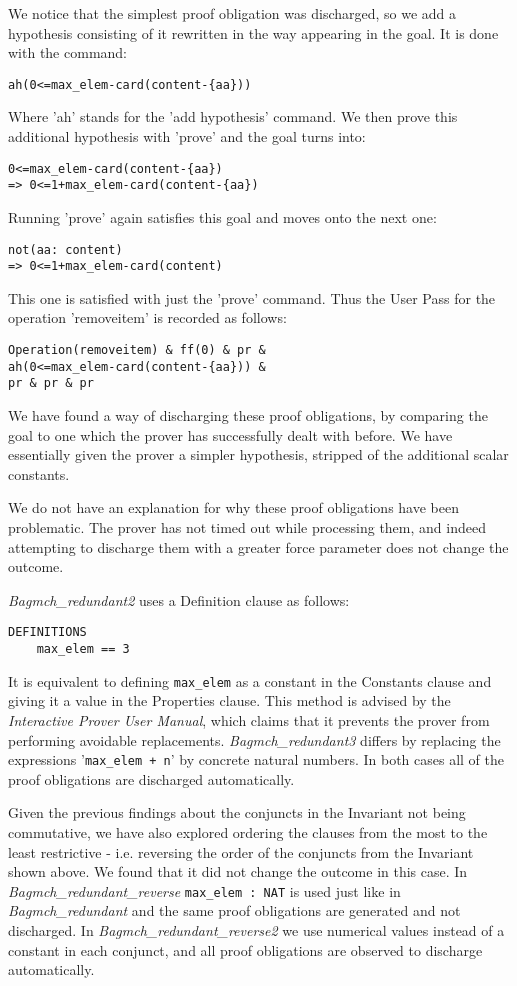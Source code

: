 \documentclass[11pt,journal]{IEEEtran}
\begin{document}
	We notice that the simplest proof obligation was discharged, so we add a hypothesis consisting of it rewritten in the way appearing in the goal. It is done with the command:
	\begin{lstlisting}
ah(0<=max_elem-card(content-{aa}))
	\end{lstlisting}
	Where 'ah' stands for the 'add hypothesis' command. We then prove this additional hypothesis with 'prove' and the goal turns into:
	\begin{lstlisting}
0<=max_elem-card(content-{aa}) 
=> 0<=1+max_elem-card(content-{aa}) 
	\end{lstlisting}
	Running 'prove' again satisfies this goal and moves onto the next one: 
	\begin{lstlisting}
not(aa: content) 
=> 0<=1+max_elem-card(content)
	\end{lstlisting}
	This one is satisfied with just the 'prove' command. Thus the User Pass for the operation 'removeitem' is recorded as follows:
	\begin{lstlisting}
Operation(removeitem) & ff(0) & pr & 
ah(0<=max_elem-card(content-{aa})) & 
pr & pr & pr
	\end{lstlisting}
	We have found a way of discharging these proof obligations, by comparing the goal to one which the prover has successfully dealt with before. We have essentially given the prover a simpler hypothesis, stripped of the additional scalar constants.
	
	We do not have an explanation for why these proof obligations have been problematic. The prover has not timed out while processing them, and indeed attempting to discharge them with a greater force parameter does not change the outcome.
	
	\emph{Bagmch\_redundant2} uses a Definition clause as follows:
	\begin{lstlisting}
DEFINITIONS
	max_elem == 3
	\end{lstlisting}
	It is equivalent to defining \texttt{max\_elem} as a constant in the Constants clause and giving it a value in the Properties clause. This method is advised by the \emph{Interactive Prover User Manual}\cite{Prover guide}, which claims that it prevents the prover from performing avoidable replacements. \emph{Bagmch\_redundant3} differs by replacing the expressions '\texttt{max\_elem + n}' by concrete natural numbers. In both cases all of the proof obligations are discharged automatically.
	
	Given the previous findings about the conjuncts in the Invariant not being commutative, we have also explored ordering the clauses from the most to the least restrictive - i.e. reversing the order of the conjuncts from the Invariant shown above. We found that it did not change the outcome in this case. In \emph{Bagmch\_redundant\_reverse} \texttt{max\_elem : NAT} is used just like in \emph{Bagmch\_redundant} and the same proof obligations are generated and not discharged. In \emph{Bagmch\_redundant\_reverse2} we use numerical values instead of a constant in each conjunct, and all proof obligations are observed to discharge automatically.
	
\end{document}
